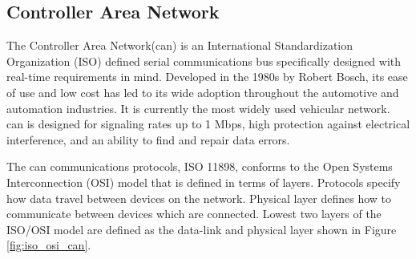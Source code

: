 \subsection{Controller Area Network} %
\label{sub:controller_area_network}
The Controller Area Network(\gls{can}) is an International Standardization Organization (ISO) defined serial communications bus  specifically designed with real-time requirements in mind. Developed in the 1980s by Robert Bosch, its ease of use and low cost has led to its wide adoption throughout the automotive and automation industries\cite{788104}. It is currently the most widely used vehicular network\cite{976923}. \gls{can} is designed for signaling rates up to 1 Mbps, high protection against electrical interference, and an ability to find and repair data errors.

The \gls{can} communications protocols,  ISO 11898, conforms to the Open Systems Interconnection (OSI) model that is defined in terms of layers\cite{5116731}. Protocols specify how data travel between devices on the network. Physical layer defines how to communicate between devices which are connected. Lowest two layers of the ISO/OSI model are defined as the data-link and physical layer shown in Figure \ref{fig:iso_osi_can}.

